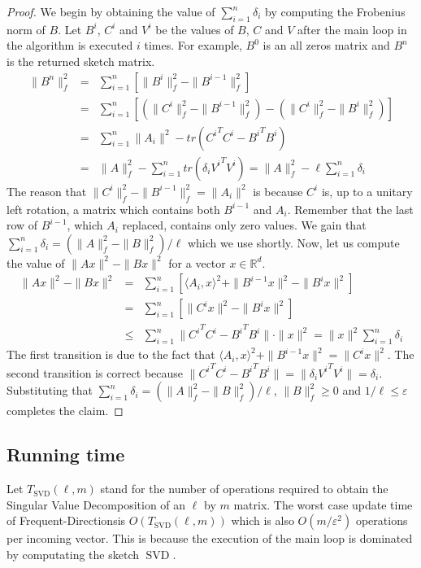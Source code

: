 \documentclass[]{article}
\newcommand{\SVD}{\operatorname{SVD}}
\newcommand{\R}{{\mathbb R}}
\newcommand{\eps}{\varepsilon}
\newcommand{\FD}{Frequent-Directions}
\begin{document}
\begin{proof}
We begin by obtaining the value of $\sum_{i=1}^{n}\delta_i$ by computing the Frobenius norm of $B$.
Let $B^i$, $C^{i}$ and $V^{i}$ be the values of $B$, $C$ and $V$ after the main loop in the algorithm is executed $i$ times.
For example, $B^0$ is an all zeros matrix and $B^n$ is the returned sketch matrix.
\begin{eqnarray*}
 \|B^n\|_{f}^{2} &=& \sum_{i=1}^{n} [\|B^{i}\|_{f}^{2} - \|B^{i-1}\|_{f}^{2}] \\
&=& \sum_{i=1}^{n} [(\|C^{i}\|_{f}^{2} - \|B^{i-1}\|_{f}^{2}) - (\|C^{i}\|_{f}^{2} - \|B^{i}\|_{f}^{2})]\\
&=& \sum_{i=1}^{n} \|A_i\|^2 - tr({C^{i}}^{T}C^{i}- {B^{i}}^{T}B^{i})  \\
&=&  \|A\|_{f}^2 - \sum_{i=1}^{n} tr(\delta_i {V^{i}}^{T}V^{i}) = \|A\|_{f}^{2} - \ell\sum_{i=1}^{n}\delta_i
\end{eqnarray*}
The reason that $\|C^{i}\|_{f}^{2} - \|B^{i-1}\|_{f}^{2} = \|A_i\|^2$ is because $C^{i}$ is, up to a unitary left rotation, a matrix which contains both $B^{i-1}$ and $A_i$. Remember that the last row of $B^{i-1}$, which $A_i$ replaced, contains only zero values.
We gain that $\sum_{i=1}^{n}\delta_i = (\|A\|_{f}^{2}-\|B\|_{f}^{2})/\ell$ which we use shortly.
Now, let us compute the value of $\|Ax\|^2 - \|Bx\|^2$ for a vector $x \in \R^d$. 
\begin{eqnarray*}
\|Ax\|^2 - \|Bx\|^2 &=& \sum_{i=1}^{n}[ \langle A_i,x\rangle^2 + \|B^{i-1}x\|^2 - \|B^{i}x\|^2] \\
&=&  \sum_{i=1}^{n}[\|C^{i}x\|^2 - \|B^{i}x\|^2] \\
&\le& \sum_{i=1}^{n}\|{C^{i}}^{T}C^{i} - {B^{i}}^{T}B^{i}\|\cdot \|x\|^{2}  = \|x\|^{2} \sum_{i=1}^{n}\delta_i
\end{eqnarray*}
The first transition is due to the fact that $\langle A_i,x\rangle^2 + \|B^{i-1}x\|^2 = \|C^{i}x\|^2$.
The second transition is correct because $\|{C^{i}}^{T}C^{i} - {B^{i}}^{T}B^{i}\|= \|\delta_i {V^{i}}^{T}V^{i}\| = \delta_i$.
Substituting that $\sum_{i = 1}^{n} \delta_i = (\|A\|_{f}^{2}-\|B\|_{f}^{2})/\ell$, $\|B\|_{f}^{2} \ge 0$ and $1/\ell \le \eps$ completes the claim.
\end{proof}

\subsection{Running time}\label{run}
Let $T_{\SVD}(\ell,m)$ stand for the number of operations required to obtain the Singular Value Decomposition of an $\ell$ by $m$ matrix.
The worst case update time of \FD is $O(T_{\SVD}(\ell,m))$ which is also $O(m/\eps^2)$ operations per incoming vector. 
This is because the execution of the main loop is dominated by computating  the sketch $\SVD$.
\end{document}
